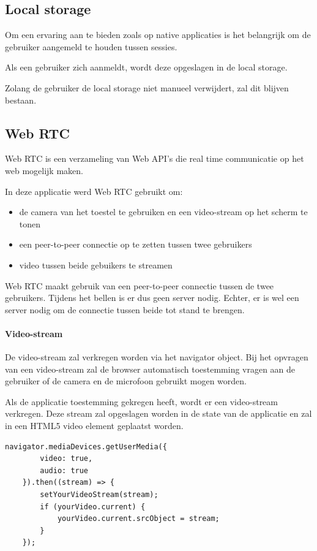 	\subsection{Local storage}
		
		Om een ervaring aan te bieden zoals op native applicaties is het belangrijk om de gebruiker aangemeld te houden tussen sessies.
		
		Als een gebruiker zich aanmeldt, wordt deze opgeslagen in de local storage.
		
		Zolang de gebruiker de local storage niet manueel verwijdert, zal dit blijven bestaan. 
		\autocite{Mozilla2020d}
		
	\subsection{Web RTC}
		
		Web RTC is een verzameling van Web API's die real time communicatie  op het web mogelijk maken. 
		
		In deze applicatie werd Web RTC gebruikt om:
		\begin{itemize}
			\item de camera van het toestel te gebruiken en een video-stream op het scherm te tonen
			\item een peer-to-peer connectie op te zetten tussen twee gebruikers
			\item video tussen beide gebuikers te streamen
		\end{itemize} 
		\autocite{webRTC2020}
		
		Web RTC maakt gebruik van een peer-to-peer connectie tussen de twee gebruikers. Tijdens het bellen is er dus geen server nodig. Echter, er is wel een server nodig om de connectie tussen beide tot stand te brengen.
		
		\paragraph{Video-stream}
			De video-stream zal verkregen worden via het navigator object. Bij het opvragen van een video-stream zal de browser automatisch toestemming vragen aan de gebruiker of de camera en de microfoon gebruikt mogen worden.
			
			Als de applicatie toestemming gekregen heeft, wordt er een video-stream verkregen.
			Deze stream zal opgeslagen worden in de state van de applicatie en zal in een HTML5 video element geplaatst worden.
		
\begin{lstlisting}
navigator.mediaDevices.getUserMedia({ 
		video: true,
		audio: true 
	}).then((stream) => {
		setYourVideoStream(stream);
		if (yourVideo.current) {
			yourVideo.current.srcObject = stream;
		}
	});
\end{lstlisting}


